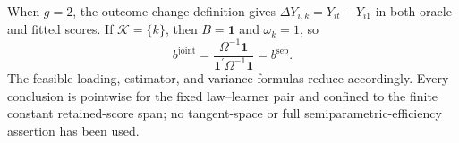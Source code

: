 When \(g=2\), the outcome-change definition gives \(\Delta Y_{i,k}=Y_{it}-Y_{i1}\) in both oracle and fitted scores. If \(\mathcal K=\{k\}\), then \(B=\mathbf 1\) and \(\omega_k=1\), so
\[
 b^{\mathrm{joint}}
 =\frac{\Omega^{-1}\mathbf 1}
 {\mathbf 1^{\prime}\Omega^{-1}\mathbf 1}
 =b^{\mathrm{sep}}.
\]
The feasible loading, estimator, and variance formulas reduce accordingly. Every conclusion is pointwise for the fixed law--learner pair and confined to the finite constant retained-score span; no tangent-space or full semiparametric-efficiency assertion has been used.